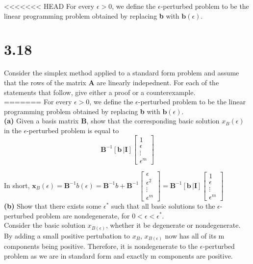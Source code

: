 \documentclass{article}
\begin{document}
\noindent 
<<<<<<< HEAD
For every $\epsilon > 0$, we define the $\epsilon$-perturbed problem to be the linear programming problem obtained by replacing \textbf{b} with $\mathbf{b}(\epsilon)$.


\section*{3.18} Consider the simplex method applied to a standard form problem and assume that the rows of the matrix \textbf{A} are linearly indepednent.  For each of the statements that follow, give either a proof or a counterexample.\\
=======
For every $\epsilon > 0$, we define the $\epsilon$-perturbed problem to be the linear programming problem obtained by replacing \textbf{b} with $\mathbf{b}(\epsilon)$.\\

\noindent
\textbf{(a)}
Given a basis matrix \textbf{B}, show that the corresponding basic solution $x_B(\epsilon)$ in the $\epsilon$-perturbed problem is equal to
$$
\mathbf{B}^{-1}[\mathbf{b} \, | \mathbf{I}]  \begin{bmatrix}
      1 \\
      \epsilon\\
       \vdots \\
       \epsilon^m 
	\end{bmatrix}
$$


\noindent
In short,
$ \mathbf{x}_B(\epsilon) = \mathbf{B}^{-1}b(\epsilon)=  \mathbf{B}^{-1}b + \mathbf{B}^{-1} \begin{bmatrix}
      \epsilon \\
      \epsilon^2\\
       \vdots \\
       \epsilon^m 
	\end{bmatrix}
= \mathbf{B}^{-1}[\mathbf{b} \, | \mathbf{I}]  \begin{bmatrix}
      1 \\
      \epsilon\\
       \vdots \\
       \epsilon^m 
	\end{bmatrix}$\\


\noindent
\textbf{(b)} 
Show that there exists some $\epsilon^*$ such that all basic solutions to the $\epsilon$-perturbed problem are nondegenerate, for $0 < \epsilon < \epsilon^*$.\\

\noindent
Consider the basic solution $x_{B(\epsilon)}$, whether it be degenerate or nondegenerate.  By adding a small positive pertubation to $x_B$, $x_{B(\epsilon)}$ now has all of its m components being positive.  Therefore, it is nondegenerate to the $\epsilon$-perturbed problem as we are in standard form and exactly m components are positive.\\
\end{document}
